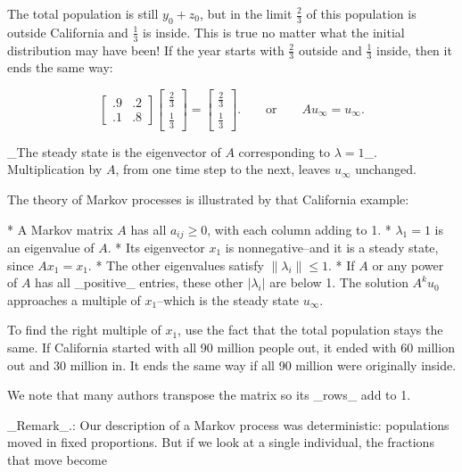 The total population is still \(y_{0}+z_{0}\), but in the limit \(\frac{2}{3}\) of this population is outside California and \(\frac{1}{3}\) is inside. This is true no matter what the initial distribution may have been! If the year starts with \(\frac{2}{3}\) outside and \(\frac{1}{3}\) inside, then it ends the same way:

\[\begin{bmatrix}.9&.2\\ .1&.8\end{bmatrix}\begin{bmatrix}\frac{2}{3}\\ \frac{1}{3}\end{bmatrix}=\begin{bmatrix}\frac{2}{3}\\ \frac{1}{3}\end{bmatrix}.\qquad\text{or}\qquad Au_{\infty}=u_{\infty}.\]

_The steady state is the eigenvector of \(A\) corresponding to \(\lambda=1\)_. Multiplication by \(A\), from one time step to the next, leaves \(u_{\infty}\) unchanged.

The theory of Markov processes is illustrated by that California example:

* A Markov matrix \(A\) has all \(a_{ij}\geq 0\), with each column adding to 1.
* \(\lambda_{1}=1\) is an eigenvalue of \(A\).
* Its eigenvector \(x_{1}\) is nonnegative--and it is a steady state, since \(Ax_{1}=x_{1}\).
* The other eigenvalues satisfy \(\|\lambda_{i}\|\leq 1\).
* If \(A\) or any power of \(A\) has all _positive_ entries, these other \(|\lambda_{i}|\) are below 1. The solution \(A^{k}u_{0}\) approaches a multiple of \(x_{1}\)--which is the steady state \(u_{\infty}\).

To find the right multiple of \(x_{1}\), use the fact that the total population stays the same. If California started with all 90 million people out, it ended with 60 million out and 30 million in. It ends the same way if all 90 million were originally inside.

We note that many authors transpose the matrix so its _rows_ add to 1.

_Remark_.: Our description of a Markov process was deterministic: populations moved in fixed proportions. But if we look at a single individual, the fractions that move become 